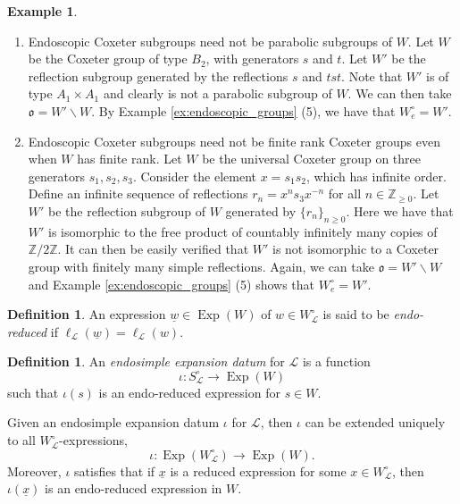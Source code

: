 \documentclass{amsart}
\newcommand{\Z}{\mathbb{Z}}
\newcommand{\scrL}{\mathcal{L}}
\newcommand{\fr}[1]{\mathfrak{#1}}
\DeclareMathOperator{\Exp}{Exp}
\newcommand{\uw}{\underline{w}}
\newcommand{\ux}{\underline{x}}
\theoremstyle{definition}
\newtheorem{definition}[subsubsection]{Definition}
\newtheorem{example}[subsubsection]{Example}
\numberwithin{equation}{subsection}
\begin{document}
\begin{example}
    \begin{enumerate}
        \item Endoscopic Coxeter subgroups need not be parabolic subgroups of $W$. 
            Let $W$ be the Coxeter group of type $B_2$, with generators $s$ and $t$. Let $W'$ be the reflection subgroup generated by the reflections $s$ and $tst$.
            Note that $W'$ is of type $A_1 \times A_1$ and clearly is not a parabolic subgroup of $W$. We can then take $\fr{o} = W' \backslash W$.
            By Example \ref{ex:endoscopic_groups} (5), we have that $W_e^{\circ} = W'$.
        \item Endoscopic Coxeter subgroups need not be finite rank Coxeter groups even when $W$ has finite rank. 
            Let $W$ be the universal Coxeter group on three generators $s_1, s_2, s_3$.
            Consider the element $x = s_1 s_2$, which has infinite order. Define an infinite sequence of reflections $r_n = x^n s_3 x^{-n}$ for all $n \in \Z_{\geq 0}$.
            Let $W'$ be the reflection subgroup of $W$ generated by $\{r_n\}_{n \geq 0}$.
            Here we have that $W'$ is isomorphic to the free product of countably infinitely many copies of $\Z/2\Z$. It can then be easily verified that $W'$ is not isomorphic to a Coxeter group with finitely many simple reflections.
            Again, we can take $\fr{o} = W' \backslash W$ and Example \ref{ex:endoscopic_groups} (5) shows that $W_e^{\circ} = W'$.
    \end{enumerate}
\end{example}

\begin{definition}
    An expression $\uw \in \Exp (W)$ of $w \in W_{\scrL}^{\circ}$ is said to be \emph{endo-reduced} if $\ell_{\scrL} (\uw) = \ell_{\scrL} (w)$.
\end{definition}

\begin{definition}
    An \emph{endosimple expansion datum} for $\scrL$ is a function
    \[\iota : S_{\scrL}^{\circ} \to \Exp (W)\]
    such that $\iota (s)$ is an endo-reduced expression for $s \in W$. 
\end{definition}

Given an endosimple expansion datum $\iota$ for $\scrL$, then $\iota$ can be extended uniquely to all $W_{\scrL}^{\circ}$-expressions,
\[\iota : \Exp (W_{\scrL}^{\circ}) \to \Exp (W).\]
Moreover, $\iota$ satisfies that if $\ux$ is a reduced expression for some $x \in W_{\scrL}^{\circ}$, then $\iota (\ux)$ is an endo-reduced expression in $W$.
\end{document}
